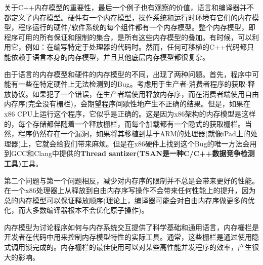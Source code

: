 关于C++内存模型的重要性，最后一个例子也有观察的价值，语言和编译器并不都定义了内存模型。硬件有一个内存模型，操作系统和运行时环境有它们的内存模型，程序运行的硬件/软件系统的每个组件都有一个内存模型。整个内存模型，即程序可用的所有保证和限制的集合，是所有这些内存模型的叠加。有时候，可以利用它，例如：在编写特定于处理器的代码时。然而，任何可移植的C++代码都只能依赖于语言本身的内存模型，并且其他底层内存模型都很复杂。

由于语言的内存模型和硬件的内存模型的不同，出现了两种问题。首先，程序中可能有一些在特定硬件上无法检测到的Bug。考虑用于生产者-消费者程序的获取-释放协议。如果犯了一个错误，在生产者端使用释放内存序，而在消费者端使用自由内存序(完全没有栅栏)，会期望程序间歇性地产生不正确的结果。但是，如果在x86 CPU上运行这个程序，它似乎是正确的。这是因为x86架构的内存模型是这样的，每个存储都伴随着一个释放栅栏，而每个加载都有一个隐式的获取栅栏。当然，程序仍然存在一个漏洞，如果将其移植到基于ARM的处理器(就像iPad上的处理器)上，它就会给我们带来麻烦。但是在x86硬件上找到这个Bug的唯一方法会用到GCC和Clang中提供的\textbf{Thread santizer(TSAN是一种C/C++数据竞争检测工具)}工具。

第二个问题与第一个问题相反，减少对内存序的限制并不总是会带来更好的性能。在一个x86处理器上从释放到自由内存序写操作不会带来任何性能上的提升，因为总的内存模型可以保证释放顺序(理论上，编译器可能会对自由内存序做更多的优化，而大多数编译器根本不会优化原子操作)。

内存模型为讨论程序如何与内存系统交互提供了科学基础和通用语言，内存栅栏是开发者在代码中用来控制内存模型特性的实际工具。通常，这些栅栏是通过使用隐式调用锁完成的。内存栅栏的最佳使用可以对某些高性能并发程序的效率，产生很大的影响。














